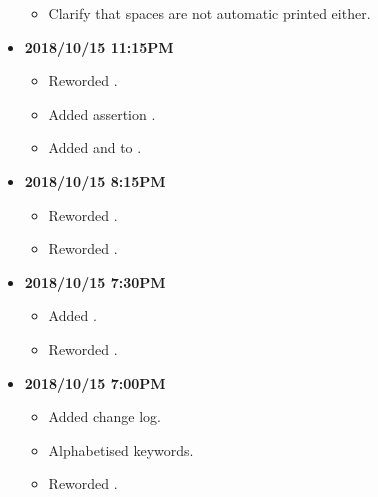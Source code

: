 \documentclass[../gazprea.tex]{subfiles}
\begin{document}
\begin{itemize}
\begin{itemize}
      \item Clarify that spaces are not automatic printed either.
    \end{itemize}
  \item
    \textbf{2018/10/15 11:15PM}
    \begin{itemize}
      \item Reworded .
      \item Added assertion .
      \item Added  and  to .
    \end{itemize}
  \item
    \textbf{2018/10/15 8:15PM}
    \begin{itemize}
      \item Reworded .
      \item Reworded .
    \end{itemize}
  \item
    \textbf{2018/10/15 7:30PM}
    \begin{itemize}
      \item Added .
      \item Reworded .
    \end{itemize}
  \item
    \textbf{2018/10/15 7:00PM}
    \begin{itemize}
      \item Added change log.
      \item Alphabetised keywords.
      \item Reworded .
    \end{itemize}
\end{itemize}
\end{document}

